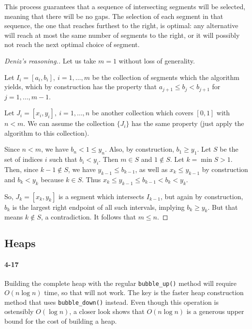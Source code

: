 \documentclass{report}
\begin{document}
\medskip

This process guarantees that a sequence of intersecting segments will be selected, meaning that there will be no gaps. The selection of each segment in that sequence, the one that reaches furthest to the right, is optimal: any alternative will reach at most the same number of segments to the right, or it will possibly not reach the next optimal choice of segment.

\begin{proof}[Deniz's reasoning.] Let us take $m=1$ without loss of generality.

Let $I_i = [a_i, b_i],\ i=1,\ldots,m$ be the collection of segments which the algorithm yields, which by construction has the property that $a_{j+1} \leq b_j < b_{j+1}$ for $j=1,\ldots,m-1$.

Let $J_i = [x_i, y_i],\ i=1,\ldots,n$ be another collection which covers $[0,1]$ with $n < m$. We can assume the collection $\{J_i\}$ has the same property (just apply the algorithm to this collection).

Since $n<m$, we have $b_n < 1 \leq y_n$. Also, by construction, $b_1 \geq y_1$. Let $S$ be the set of indices $i$ such that $b_i < y_i$. Then $m\in S$ and $1\notin S$. Let $k = \min S > 1$. Then, since $k - 1 \notin S$, we have $y_{k-1} \leq b_{k-1}$, as well as $x_k \leq y_{k-1}$ by construction and $b_k < y_k$ because $k\in S$. Thus $x_k \leq y_{k-1} \leq b_{k-1} < b_k < y_k$.

So, $J_k = [x_k, y_k]$ is a segment which intersects $I_{k-1}$, but again by construction, $b_k$ is the largest right endpoint of all such intervals, implying $b_k \geq y_k$. But that means $k\notin S$, a contradiction. It follows that $m \leq n$.
\end{proof}

\subsection*{Heaps}

\paragraph{4-17} Building the complete heap with the regular \lstinline!bubble_up()! method will require $O(n\log n)$ time, so that will not work. The key is the faster heap construction method that uses \lstinline!bubble_down()! instead. Even though this operation is ostensibly $O(\log n)$, a closer look shows that $O(n\log n)$ is a generous upper bound for the cost of building a heap.
\end{document}
